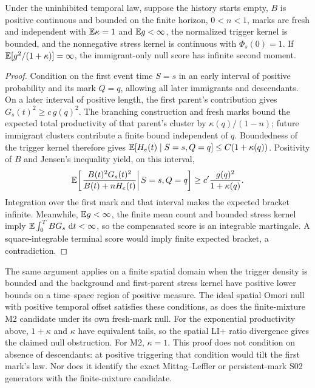 \begin{proposition}
\label{prop:null-score-obstruction}
Under the uninhibited temporal law, suppose the history starts empty, \(B\) is positive continuous and bounded on the finite horizon, \(0<n<1\), marks are fresh and independent with \(\mathbb{E}\kappa=1\) and \(\mathbb{E} g<\infty\), the normalized trigger kernel is bounded, and the nonnegative stress kernel is continuous with \(\Phi_s(0)=1\). If \(\mathbb{E}[g^2/(1+\kappa)]=\infty\), the immigrant-only null score has infinite second moment.
\end{proposition}
\begin{proof}
Condition on the first event time \(S=s\) in an early interval of positive probability and its mark \(Q=q\), allowing all later immigrants and descendants. On a later interval of positive length, the first parent's contribution gives \(G_s(t)^2\ge c\,g(q)^2\). The branching construction and fresh marks bound the expected total productivity of that parent's cluster by \(\kappa(q)/(1-n)\); future immigrant clusters contribute a finite bound independent of \(q\). Boundedness of the trigger kernel therefore gives \(\mathbb{E}[H_e(t)\mid S=s,Q=q]\le C(1+\kappa(q))\). Positivity of \(B\) and Jensen's inequality yield, on this interval,
\[
\mathbb{E}\!\left[\left.\frac{B(t)^2G_s(t)^2}{B(t)+nH_e(t)}
        \right|S=s,Q=q\right]
\ge c'\frac{g(q)^2}{1+\kappa(q)}.
\]
Integration over the first mark and that interval makes the expected bracket infinite. Meanwhile, \(\mathbb{E} g<\infty\), the finite mean count and bounded stress kernel imply \(\mathbb{E}\int_0^T B G_s\,\mathop{}\!\mathrm{d} t<\infty\), so the compensated score is an integrable martingale. A square-integrable terminal score would imply finite expected bracket, a contradiction.
\end{proof}

The same argument applies on a finite spatial domain when the trigger density is bounded and the background and first-parent stress kernel have positive lower bounds on a time--space region of positive measure. The ideal spatial Omori null with positive temporal offset satisfies these conditions, as does the finite-mixture M2 candidate under its own fresh-mark null. For the exponential productivity above, \(1+\kappa\) and \(\kappa\) have equivalent tails, so the spatial LI+ ratio divergence gives the claimed null obstruction. For M2, \(\kappa=1\). This proof does not condition on absence of descendants: at positive triggering that condition would tilt the first mark's law. Nor does it identify the exact Mittag--Leffler or persistent-mark S02 generators with the finite-mixture candidate.


